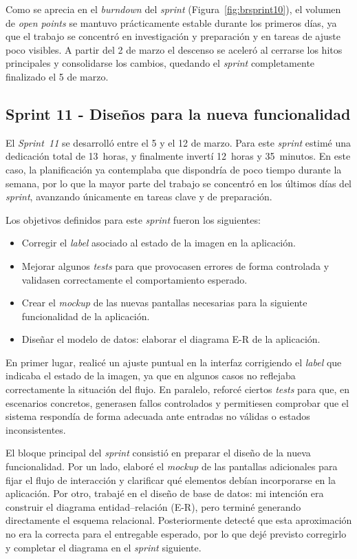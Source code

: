 Como se aprecia en el \textit{burndown} del \textit{sprint} (Figura~\ref{fig:brsprint10}), el volumen de \textit{open points} se mantuvo prácticamente estable durante los primeros días, ya que el trabajo se concentró en investigación y preparación y en tareas de ajuste poco visibles. A partir del 2 de marzo el descenso se aceleró al cerrarse los hitos principales y consolidarse los cambios, quedando el \textit{sprint} completamente finalizado el 5 de marzo.

\subsection{Sprint 11 - Diseños para la nueva funcionalidad}
El \textit{Sprint~11} se desarrolló entre el 5 y el 12 de marzo. Para este \textit{sprint} estimé una dedicación total de 13~horas, y finalmente invertí 12~horas y 35~minutos. En este caso, la planificación ya contemplaba que dispondría de poco tiempo durante la semana, por lo que la mayor parte del trabajo se concentró en los últimos días del \textit{sprint}, avanzando únicamente en tareas clave y de preparación.

Los objetivos definidos para este \textit{sprint} fueron los siguientes:
\begin{itemize}
	\item Corregir el \textit{label} asociado al estado de la imagen en la aplicación.
	\item Mejorar algunos \textit{tests} para que provocasen errores de forma controlada y validasen correctamente el comportamiento esperado.
	\item Crear el \textit{mockup} de las nuevas pantallas necesarias para la siguiente funcionalidad de la aplicación.
	\item Diseñar el modelo de datos: elaborar el diagrama E-R de la aplicación.
\end{itemize}

En primer lugar, realicé un ajuste puntual en la interfaz corrigiendo el \textit{label} que indicaba el estado de la imagen, ya que en algunos casos no reflejaba correctamente la situación del flujo. En paralelo, reforcé ciertos \textit{tests} para que, en escenarios concretos, generasen fallos controlados y permitiesen comprobar que el sistema respondía de forma adecuada ante entradas no válidas o estados inconsistentes.

El bloque principal del \textit{sprint} consistió en preparar el diseño de la nueva funcionalidad. Por un lado, elaboré el \textit{mockup} de las pantallas adicionales para fijar el flujo de interacción y clarificar qué elementos debían incorporarse en la aplicación. Por otro, trabajé en el diseño de base de datos: mi intención era construir el diagrama entidad--relación (E-R), pero terminé generando directamente el esquema relacional. Posteriormente detecté que esta aproximación no era la correcta para el entregable esperado, por lo que dejé previsto corregirlo y completar el diagrama en el \textit{sprint} siguiente.


